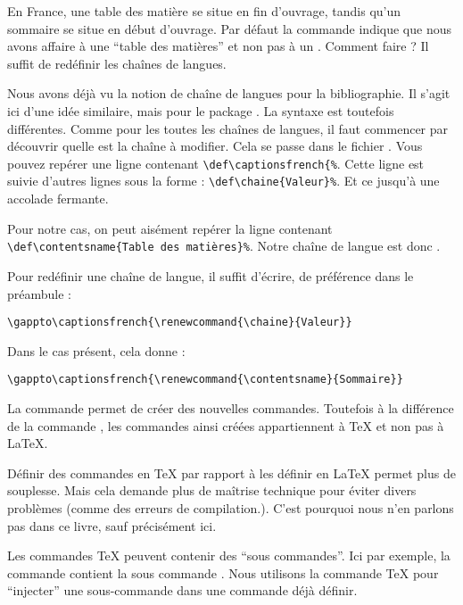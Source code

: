 En France, une table des matière se situe en fin d'ouvrage, tandis qu'un sommaire se situe en début d'ouvrage. Par défaut la commande  indique que nous avons affaire à une  \enquote{table des matières} et non pas à un . Comment faire ? Il suffit de redéfinir les chaînes de langues. 

Nous avons déjà vu la notion de chaîne de langues pour la bibliographie. Il s'agit ici  d'une idée similaire, mais pour le package . La syntaxe est toutefois différentes. Comme pour les toutes les chaînes de langues, il faut commencer par découvrir quelle est la chaîne à modifier. Cela se passe dans le fichier . Vous pouvez repérer une ligne contenant \verb|\def\captionsfrench{%|. 
Cette ligne est suivie d'autres lignes sous la forme : \verb|\def\chaine{Valeur}%|. Et ce jusqu'à une accolade fermante.

Pour notre cas, on peut aisément repérer la ligne contenant \verb|\def\contentsname{Table des matières}%|.
Notre chaîne de langue est donc .

Pour  redéfinir une chaîne de langue, il suffit d'écrire, de préférence dans le préambule :

\begin{verbatim}
\gappto\captionsfrench{\renewcommand{\chaine}{Valeur}}
\end{verbatim}

Dans le cas présent, cela donne :

\begin{verbatim}
\gappto\captionsfrench{\renewcommand{\contentsname}{Sommaire}}
\end{verbatim}



\begin{plusloins}
La commande  permet de créer des nouvelles commandes. Toutefois à la différence de la commande , les commandes ainsi créées appartiennent à \TeX{} et non pas à \LaTeX{}.

Définir des commandes en \TeX{} par rapport à les définir en \LaTeX{} permet plus de souplesse. Mais cela demande plus de maîtrise technique pour éviter divers problèmes (comme des erreurs de compilation.). C'est pourquoi nous n'en parlons pas dans ce livre, sauf précisément ici.

Les commandes \TeX{} peuvent contenir des \enquote{sous commandes}. Ici par exemple, la commande  contient la sous commande . Nous utilisons la commande \TeX{}  pour \enquote{injecter} une sous-commande dans une commande déjà définir.
\end{plusloins}

